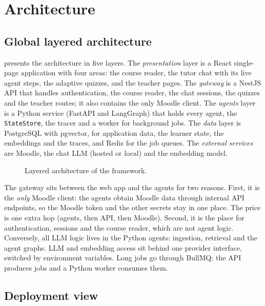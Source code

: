 \section{Architecture}
\label{sec-d-arch}

\subsection{Global layered architecture}

 presents the architecture in five layers. The
\emph{presentation} layer is a React single-page application with four
areas: the course reader, the tutor chat with its live agent steps, the
adaptive quizzes, and the teacher pages. The \emph{gateway} is a NestJS
API that handles authentication, the course reader, the chat sessions,
the quizzes and the teacher routes; it also contains the only Moodle
client. The \emph{agents} layer is a Python service (FastAPI and
LangGraph) that holds every agent, the \texttt{StateStore}, the tracer
and a worker for background jobs. The \emph{data} layer is PostgreSQL with
pgvector, for application data, the learner state, the embeddings and the
traces, and Redis for the job queues. The \emph{external services} are
Moodle, the chat LLM (hosted or local) and the embedding model.

\begin{figure}[htbp]
  \centering
  \caption{Layered architecture of the framework.}
  \label{fig-architecture}
\end{figure}

The gateway sits between the web app and the agents for two reasons.
First, it is the \emph{only} Moodle client: the agents obtain Moodle data
through internal API endpoints, so the Moodle token and the other secrets
stay in one place. The price is one extra hop (agents, then API, then
Moodle). Second, it is the place for authentication, sessions and the
course reader, which are not agent logic. Conversely, all LLM logic lives
in the Python agents: ingestion, retrieval and the agent graphs. LLM and
embedding access sit behind one provider interface, switched by
environment variables. Long jobs go through BullMQ: the API produces jobs
and a Python worker consumes them.

\subsection{Deployment view}

